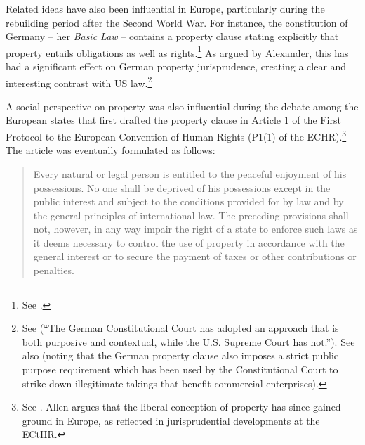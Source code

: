 Related ideas have also been influential in Europe, particularly during the rebuilding period after the Second World War. For instance, the constitution of Germany -- her {\it Basic Law} -- contains a property clause stating explicitly that property entails obligations as well as rights.\footnote{See \cite[14]{basic49}.} As argued by Alexander, this has had a significant effect on German property jurisprudence, creating a clear and interesting contrast with US law.\footnote{See \cite[738]{alexander03} (``The German Constitutional Court has adopted an approach that is both purposive and contextual, while the U.S. Supreme Court has not.''). See also \cite[476-483]{walt11} (noting that the German property clause also imposes a strict public purpose requirement which has been used by the Constitutional Court to strike down illegitimate takings that benefit commercial enterprises).}

A social perspective on property was also influential during the debate among the European states that first drafted the property clause in Article 1 of the First Protocol to the European Convention of Human Rights (P1(1) of the ECHR).\footnote{See \cite[1063-1065]{allen10}. Allen argues that the liberal conception of property has since gained ground in Europe, as reflected in jurisprudential developments at the ECtHR.} The article was eventually formulated as follows:

\begin{quote} Every natural or legal person is entitled to the peaceful enjoyment of his possessions. No one shall be deprived of his possessions except in the public interest and subject to the conditions provided for by law and by the general principles of international law.
\vspace{2.5 cm}
The preceding provisions shall not, however, in any way impair the right of a state to enforce such laws as it deems necessary to control the use of property in accordance with the general interest or to secure the payment of taxes or other contributions or penalties.
\end{quote}

